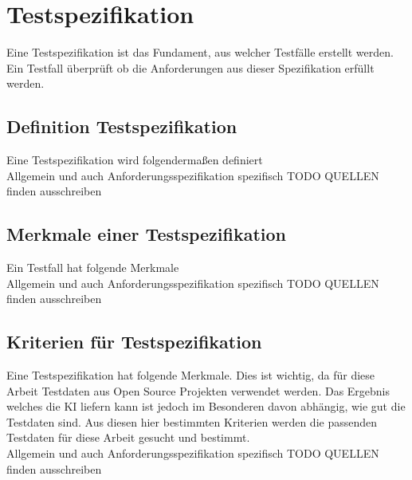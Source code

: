 \documentclass[12pt,toc=bib,toc=listof]{scrreprt}
\begin{document}
\section{Testspezifikation} %
\label{sec:testspezifikation}
Eine Testspezifikation ist das Fundament, aus welcher Testfälle erstellt werden. Ein Testfall überprüft ob die Anforderungen aus dieser Spezifikation erfüllt werden.

\subsection{Definition Testspezifikation} %
\label{sec:definitionTestspezifikation}
Eine Testspezifikation wird folgendermaßen definiert\\
Allgemein und auch Anforderungsspezifikation spezifisch
TODO QUELLEN finden ausschreiben

\subsection{Merkmale einer Testspezifikation} %
\label{sec:merkmaleEinerTestspezifikation}
Ein Testfall hat folgende Merkmale\\
Allgemein und auch Anforderungsspezifikation spezifisch
TODO QUELLEN finden ausschreiben

\subsection{Kriterien für Testspezifikation} %
\label{sec:kriterienFürTestspezifikation}
Eine Testspezifikation hat folgende Merkmale. Dies ist wichtig, da für diese Arbeit Testdaten aus Open Source Projekten verwendet werden. Das Ergebnis welches die KI liefern kann ist jedoch im Besonderen davon abhängig, wie gut die Testdaten sind. Aus diesen hier bestimmten Kriterien werden die passenden Testdaten für diese Arbeit gesucht und bestimmt.\\
Allgemein und auch Anforderungsspezifikation spezifisch
TODO QUELLEN finden ausschreiben
\end{document}
